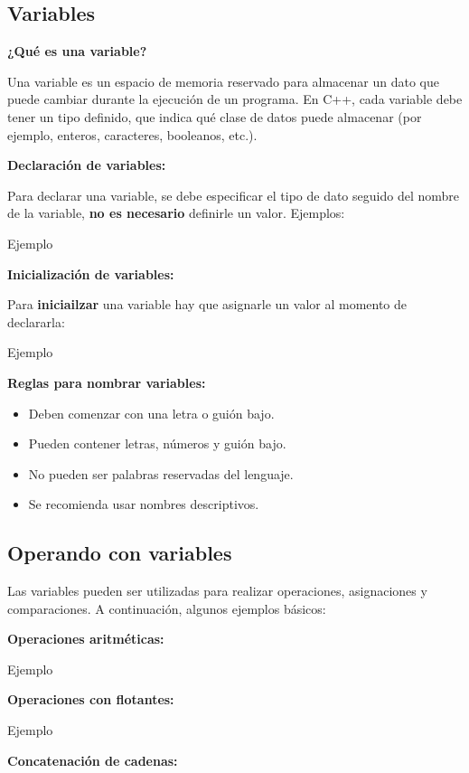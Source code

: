 \documentclass{article}
\newcommand{\cppfile}[2][]{
    \begin{container}{\faCode \space \space  #1}
        
    \end{container}
}
\begin{document}
\subsection{Variables}

\textbf{¿Qué es una variable?}

Una variable es un espacio de memoria reservado para almacenar un dato que puede cambiar durante la ejecución de un programa. En C++, cada variable debe tener un tipo definido, que indica qué clase de datos puede almacenar (por ejemplo, enteros, caracteres, booleanos, etc.).

\textbf{Declaración de variables:}

Para declarar una variable, se debe especificar el tipo de dato seguido del nombre de la variable, \textbf{no es necesario} definirle un valor. Ejemplos:


\cppfile[Ejemplo]{codes/definir.cpp}

\textbf{Inicialización de variables:}

Para \textbf{iniciailzar} una variable hay que asignarle un valor al momento de declararla:

\cppfile[Ejemplo]{codes/variables1.cpp}


\textbf{Reglas para nombrar variables:}
\begin{itemize}
    \item Deben comenzar con una letra o guión bajo.
    \item Pueden contener letras, números y guión bajo.
    \item No pueden ser palabras reservadas del lenguaje.
    \item Se recomienda usar nombres descriptivos.
\end{itemize}

\subsection{Operando con variables}

Las variables pueden ser utilizadas para realizar operaciones, asignaciones y comparaciones. A continuación, algunos ejemplos básicos:

\textbf{Operaciones aritméticas:}

\cppfile[Ejemplo]{codes/variables2.cpp}

\textbf{Operaciones con flotantes:}

\cppfile[Ejemplo]{codes/variables3.cpp}

\textbf{Concatenación de cadenas:}
\end{document}
